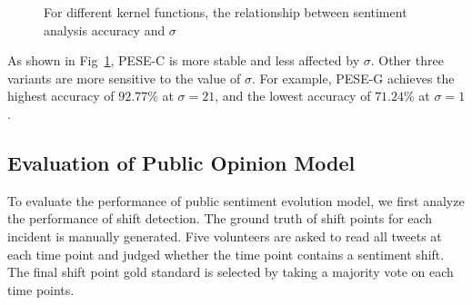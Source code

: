 \documentclass[runningheads]{llncs}
\begin{document}
\vspace{-0.8cm}
\begin{figure}
\centering
{}
\hspace{-4ex}
\setlength{\abovecaptionskip}{-0.1cm}
\caption{For different kernel functions, the relationship between sentiment analysis accuracy and $\sigma$}\label{fig:sigma}
\end{figure}

As shown in Fig~\ref{fig:sigma}, PESE-C is more stable and less affected by $\sigma$. Other three variants are more sensitive to the value of $\sigma$. For example, PESE-G achieves the highest accuracy of $92.77\%$ at $\sigma=21$, and the lowest accuracy of $71.24\%$ at $\sigma=1$.


\vspace{-0.4cm}
\subsection{Evaluation of Public Opinion Model}
To evaluate the performance of public sentiment evolution model, we first analyze the performance of shift detection. The ground truth of shift points for each incident is manually generated. Five volunteers are asked to read all tweets at each time point and judged whether the time point contains a sentiment shift. The final shift point gold standard is selected by taking a  majority vote on each time points.
\end{document}
